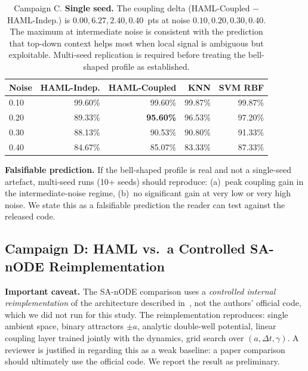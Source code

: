 \documentclass[11pt,a4paper]{article}
\begin{document}
\begin{table}[h]
\centering
\begin{tabular}{lrrrr}
\toprule
\textbf{Noise} & \textbf{HAML-Indep.} & \textbf{HAML-Coupled} & \textbf{KNN} & \textbf{SVM RBF} \\
\midrule
0.10 & 99.60\% & 99.60\%          & 99.87\% & 99.87\% \\
0.20 & 89.33\% & \textbf{95.60\%} & 96.53\% & 97.20\% \\
0.30 & 88.13\% & 90.53\%          & 90.80\% & 91.33\% \\
0.40 & 84.67\% & 85.07\%          & 83.33\% & 87.33\% \\
\bottomrule
\end{tabular}
\caption{Campaign C. \textbf{Single seed.} The coupling delta
(HAML-Coupled $-$ HAML-Indep.) is $0.00, 6.27, 2.40, 0.40$~pts at noise
$0.10, 0.20, 0.30, 0.40$. The maximum at intermediate noise is consistent with the
prediction that top-down context helps most when local signal is ambiguous but
exploitable. Multi-seed replication is required before treating the bell-shaped profile
as established.}
\label{tab:campaign_c}
\end{table}

\textbf{Falsifiable prediction.} If the bell-shaped profile is real and not a single-seed
artefact, multi-seed runs (10+ seeds) should reproduce: (a)~peak coupling gain in the
intermediate-noise regime, (b)~no significant gain at very low or very high noise. We
state this as a falsifiable prediction the reader can test against the released code.

\subsection{Campaign D: HAML vs.\ a Controlled SA-nODE Reimplementation}

\textbf{Important caveat.} The SA-nODE comparison uses a \emph{controlled internal
reimplementation} of the architecture described in~\cite{marino2024}, not the authors'
official code, which we did not run for this study. The reimplementation reproduces:
single ambient space, binary attractors $\pm a$, analytic double-well potential, linear
coupling layer trained jointly with the dynamics, grid search over $(a, \Delta t, \gamma)$.
A reviewer is justified in regarding this as a weak baseline: a paper comparison should
ultimately use the official code. We report the result as preliminary.
\end{document}
